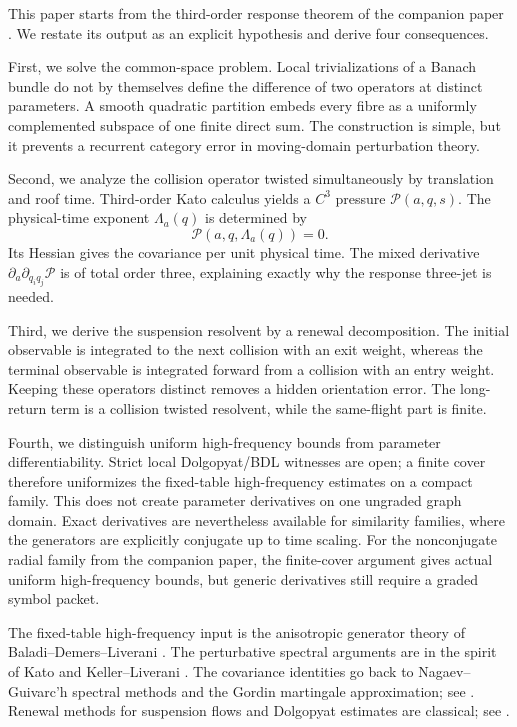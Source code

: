 \documentclass[11pt,reqno]{amsart}
\theoremstyle{definition}
\theoremstyle{remark}
\newcommand{\cP}{\mathscr P}
\begin{document}
This paper starts from the third-order response theorem of the companion paper
\cite{QiResponse}.  We restate its output as an explicit hypothesis and derive
four consequences.

First, we solve the common-space problem.  Local trivializations of a Banach
bundle do not by themselves define the difference of two operators at distinct
parameters.  A smooth quadratic partition embeds every fibre as a uniformly
complemented subspace of one finite direct sum.  The construction is simple,
but it prevents a recurrent category error in moving-domain perturbation
theory.

Second, we analyze the collision operator twisted simultaneously by
translation and roof time.  Third-order Kato calculus yields a $C^3$ pressure
$\cP(a,q,s)$.  The physical-time exponent $\Lambda_a(q)$ is determined by
\[
 \cP(a,q,\Lambda_a(q))=0.
\]
Its Hessian gives the covariance per unit physical time.  The mixed derivative
$\partial_a\partial_{q_iq_j}\cP$ is of total order three, explaining exactly
why the response three-jet is needed.

Third, we derive the suspension resolvent by a renewal decomposition.  The
initial observable is integrated to the next collision with an exit weight,
whereas the terminal observable is integrated forward from a collision with an
entry weight.  Keeping these operators distinct removes a hidden orientation
error.  The long-return term is a collision twisted resolvent, while the
same-flight part is finite.

Fourth, we distinguish uniform high-frequency bounds from parameter
differentiability.  Strict local Dolgopyat/BDL witnesses are open; a finite
cover therefore uniformizes the fixed-table high-frequency estimates on a
compact family.  This does not create parameter derivatives on one ungraded
graph domain.  Exact derivatives are nevertheless available for similarity
families, where the generators are explicitly conjugate up to time scaling.
For the nonconjugate radial family from the companion paper, the finite-cover
argument gives actual uniform high-frequency bounds, but generic derivatives
still require a graded symbol packet.

The fixed-table high-frequency input is the anisotropic generator theory of
Baladi--Demers--Liverani \cite{BaladiDemersLiverani2018}.  The perturbative
spectral arguments are in the spirit of Kato and Keller--Liverani
\cite{Kato1995,KellerLiverani1999}.  The covariance identities go back to
Nagaev--Guivarc'h spectral methods and the Gordin martingale approximation; see
\cite{Gordin1969,Gouezel2005}.  Renewal methods for suspension flows and
Dolgopyat estimates are classical; see \cite{Dolgopyat1998,Melbourne2007}.
\end{document}
